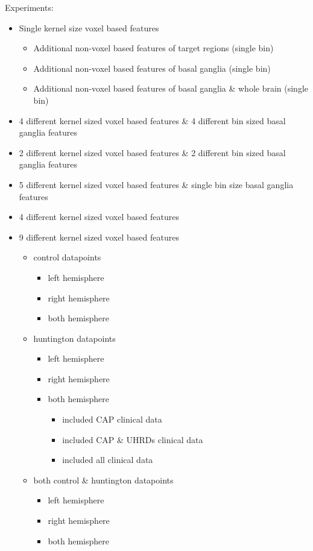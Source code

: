 Experiments:

\begin{itemize}
  \item Single kernel size voxel based features
  \begin{itemize}
    \item Additional non-voxel based features of target regions (single bin)
    \item Additional non-voxel based features of basal ganglia (single bin)
    \item Additional non-voxel based features of basal ganglia \& whole brain (single bin)
  \end{itemize}
  \item 4 different kernel sized voxel based features \& 4 different bin sized basal ganglia features
  \item 2 different kernel sized voxel based features \& 2 different bin sized basal ganglia features
  \item 5 different kernel sized voxel based features \& single bin size basal ganglia features
  \item 4 different kernel sized voxel based features
  \item 9 different kernel sized voxel based features
  \begin{itemize}
    \item control datapoints
    \begin{itemize}
      \item left hemisphere
      \item right hemisphere
      \item both hemisphere
    \end{itemize}
    \item huntington datapoints
    \begin{itemize}
      \item left hemisphere
      \item right hemisphere
      \item both hemisphere
      \begin{itemize}
        \item included CAP clinical data
        \item included CAP \& UHRDs clinical data
        \item included all clinical data
      \end{itemize}
    \end{itemize}
    \item both control \& huntington datapoints
    \begin{itemize}
      \item left hemisphere
      \item right hemisphere
      \item both hemisphere
    \end{itemize}
  \end{itemize}
\end{itemize}

